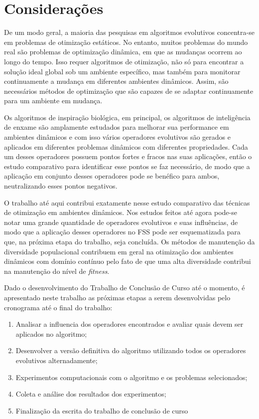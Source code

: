 \chapter{Considerações}
\label{ch:consideracoes}

De um modo geral, a maioria das pesquisas em algoritmos evolutivos concentra-se em problemas de otimização estáticos. No entanto, muitos problemas do mundo real são problemas de optimização dinâmica, em que as mudanças ocorrem ao longo do tempo. Isso requer algoritmos de otimização, não só para encontrar a solução ideal global sob um ambiente específico, mas também para monitorar continuamente a mudança em diferentes ambientes dinâmicos. Assim, são necessários métodos de optimização que são capazes de se adaptar continuamente para um ambiente em mudança.

Os algoritmos de inspiração biológica, em principal, os algoritmos de inteligência de enxame são amplamente estudados para melhorar sua performance em ambientes dinâmicos e com isso vários operadores evolutivos são gerados e aplicados em diferentes problemas dinâmicos com diferentes propriedades. Cada um desses operadores possuem pontos fortes e fracos nas suas aplicações, então o estudo comparativo para identificar esse pontos se faz necessário, de modo que a aplicação em conjunto desses operadores pode se benéfico para ambos, neutralizando esses pontos negativos.

O trabalho até aqui contribui exatamente nesse estudo comparativo das técnicas de otimização em ambientes dinâmicos. Nos estudos feitos até agora pode-se notar uma grande quantidade de operadores evolutivos e suas influências, de modo que a aplicação desses operadores no FSS pode ser esquematizada para que, na próxima etapa do trabalho, seja concluída. Os métodos de manutenção da diversidade populacional contribuem em geral na otimização dos ambientes dinâmicos com domínio contínuo pelo fato de que uma alta diversidade contribui na manutenção do nível de \textit{fitness}.

Dado o desenvolvimento do Trabalho de Conclusão de Curso até o momento, é apresentado neste trabalho as próximas etapas a serem desenvolvidas pelo cronograma até o final do trabalho:

\begin{enumerate}
\item Analisar a influencia dos operadores encontrados e avaliar quais devem ser aplicados no algoritmo;
\item Desenvolver a versão definitiva do algoritmo utilizando todos os operadores evolutivos alternadamente;
\item Experimentos computacionais com o algoritmo e os problemas selecionados;
\item Coleta e análise dos resultados dos experimentos; 
\item Finalização da escrita do trabalho de conclusão de curso
\end{enumerate}

